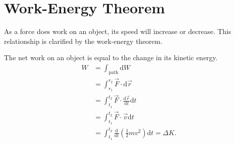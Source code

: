\documentclass[../classical_mechanics.tex]{subfiles}
\begin{document}
    \section{Work-Energy Theorem}\label{sec:work-energy-theorem}
        As a force does work on an object, its speed will increase or decrease.
        This relationship is clarified by the work-energy theorem.
        \begin{theorem}
            The net work on an object is equal to the change in its kinetic energy.
            \begin{align}
                W&=\int_\mathrm{path}\mathrm{d}W\\
                &=\int_{r_1}^{r_2}\vec{F}\cdot\mathrm{d}\vec{r}\\
                &=\int_{t_1}^{t_2}\vec{F}\cdot\frac{\mathrm{d}\vec{r}}{\mathrm{d}t}\mathrm{d}t\\
                &=\int_{t_1}^{t_2}\vec{F}\cdot\vec{v}\mathrm{d}t\\
                &=\int_{t_1}^{t_2}\frac{\mathrm{d}}{\mathrm{d}t}\left(\frac{1}{2}mv^2\right)\mathrm{d}t=\Delta K.
            \end{align}
        \end{theorem}
\end{document}
